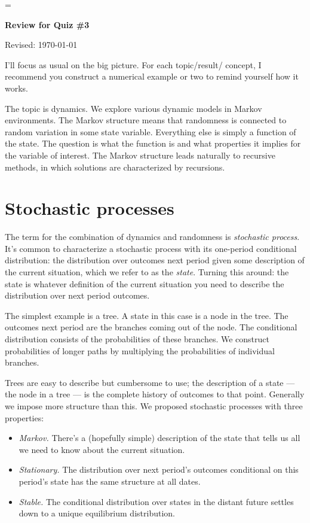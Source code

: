 \documentclass[11pt]{article}
\begin{document}
\parskip=\bigskipamount
\parindent=0.0in
\thispagestyle{empty}


\bigskip\bigskip
\centerline{\Large \bf Review for Quiz \#3}
\centerline{Revised: \today}

\bigskip
I'll focus as usual on the big picture.
For each topic/result/ concept, I recommend you construct a numerical example or two to
remind yourself how it works.

The topic is dynamics.  We explore various dynamic models in Markov environments.
The Markov structure means that randomness is connected to random variation in 
some state variable.  
Everything else is simply a function of the state.  
The question is what the function is and what properties it implies for the variable of interest. 
The Markov structure leads naturally to recursive methods, in which solutions
are characterized by recursions.  



\section{Stochastic processes}

The term for the combination of dynamics and randomness is {\it stochastic process\/}.
It's common to characterize a stochastic process with its one-period conditional distribution:
the distribution over outcomes next period given 
some description of the current situation, which we refer to as the {\it state\/}.
Turning this around:  the state is whatever definition of the current situation you need
to describe the distribution over next period outcomes. 

The simplest example is a tree.
A state in this case is a node in the tree.
The outcomes next period are the branches coming out of the node.
The conditional distribution consists of the probabilities of these branches.
We construct probabilities of longer paths by multiplying the probabilities of individual branches.

Trees are easy to describe but cumbersome to use;
the description of a state --- the node in a tree --- is the complete
history of outcomes to that point.
Generally we impose more structure than this.
We proposed stochastic processes with three properties:
%
\begin{itemize}
\item {\it Markov.\/} There's a (hopefully simple) description of the state
that tells us all we need to know about the current situation.
\item {\it Stationary.\/}
The distribution over next period's outcomes conditional on this period's state
has the same structure at all dates.
\item {\it Stable.\/}
The conditional distribution over states in the distant future settles down
to a unique equilibrium distribution.
\end{itemize}
\end{document}
